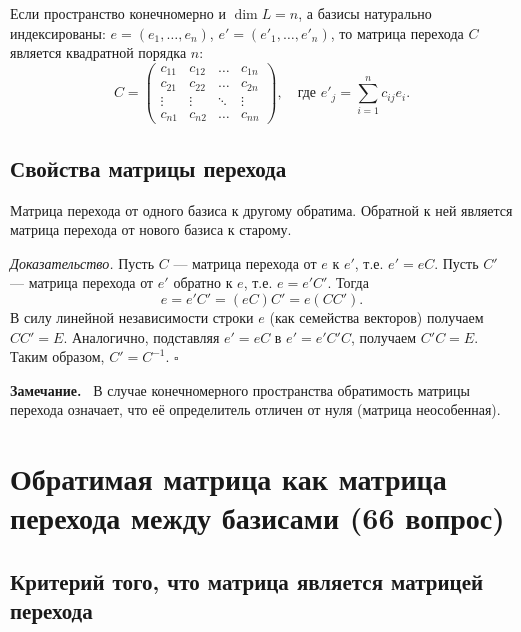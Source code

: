 \documentclass[a4paper,12pt]{article}
\newcommand{\myremark}{\textbf{Замечание.}\ }
\theoremstyle{definition}
\theoremstyle{plain}
\theoremstyle{remark}
\begin{document}
	Если пространство конечномерно и \( \dim L = n \), а базисы натурально индексированы: \( e = (e_1, \dots, e_n) \), \( e' = (e'_1, \dots, e'_n) \), то матрица перехода \( C \) является квадратной порядка \( n \):
	\[
	C = \begin{pmatrix}
		c_{11} & c_{12} & \dots & c_{1n} \\
		c_{21} & c_{22} & \dots & c_{2n} \\
		\vdots & \vdots & \ddots & \vdots \\
		c_{n1} & c_{n2} & \dots & c_{nn}
	\end{pmatrix},
	\quad \text{где } e'_j = \sum_{i=1}^n c_{ij} e_i.
	\]
	
	\subsection{Свойства матрицы перехода}
	
	\begin{tcolorbox}[colback=green!5, colframe=green!50!black, title=Предложение]
		Матрица перехода от одного базиса к другому обратима. Обратной к ней является матрица перехода от нового базиса к старому.
	\end{tcolorbox}
	
	\medskip
	\textit{Доказательство.}
	Пусть \( C \) — матрица перехода от \( e \) к \( e' \), т.е. \( e' = eC \). Пусть \( C' \) — матрица перехода от \( e' \) обратно к \( e \), т.е. \( e = e' C' \). Тогда
	\[
	e = e' C' = (eC) C' = e (C C').
	\]
	В силу линейной независимости строки \( e \) (как семейства векторов) получаем \( C C' = E \). Аналогично, подставляя \( e' = e C \) в \( e' = e' C' C \), получаем \( C' C = E \). Таким образом, \( C' = C^{-1} \). \hfill \(\square\)
	
	\myremark
	В случае конечномерного пространства обратимость матрицы перехода означает, что её определитель отличен от нуля (матрица неособенная).
	
	
	
	
	
	
	\newpage
	\section{Обратимая матрица как матрица перехода между базисами (66 вопрос)}
	
	\subsection{Критерий того, что матрица является матрицей перехода}
	
\end{document}
